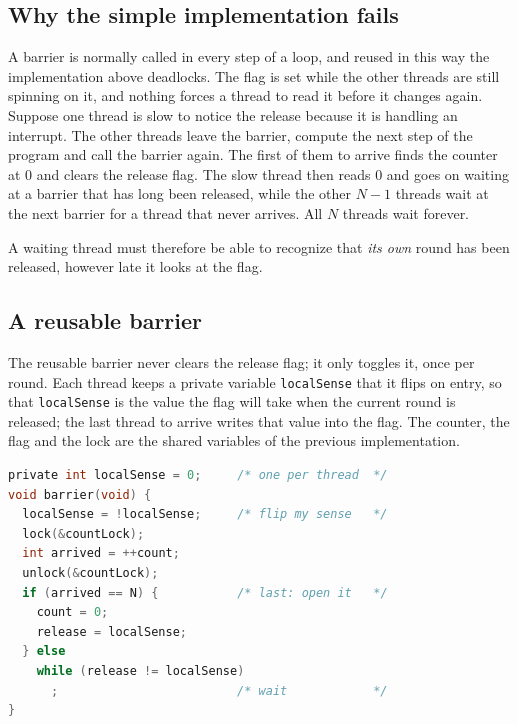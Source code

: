\documentclass[../main.tex]{subfiles}
\begin{document}
\subsection{Why the simple implementation fails}

A barrier is normally called in every step of a loop, and reused in this
way the implementation above deadlocks.  The flag is set while the other
threads are still spinning on it, and nothing forces a thread to read it
before it changes again.  Suppose one thread is slow to notice the release
because it is handling an interrupt.  The other threads leave the barrier,
compute the next step of the program and call the barrier again.  The first
of them to arrive finds the counter at 0 and clears the release flag.  The
slow thread then reads 0 and goes on waiting at a barrier that has long been
released, while the other $N-1$ threads wait at the next barrier for a
thread that never arrives.  All $N$ threads wait forever.

A waiting thread must therefore be able to recognize that \emph{its own}
round has been released, however late it looks at the flag.

\subsection{A reusable barrier}

The reusable barrier never clears the release flag; it only toggles it, once
per round.  Each thread keeps a private variable \texttt{localSense} that it
flips on entry, so that \texttt{localSense} is the value the flag will take
when the current round is released; the last thread to arrive writes that
value into the flag.  The counter, the flag and the lock are the shared
variables of the previous implementation.
\begin{lstlisting}[language=C, numbers=none, morekeywords={shared,private}]
private int localSense = 0;     /* one per thread  */
void barrier(void) {
  localSense = !localSense;     /* flip my sense   */
  lock(&countLock);
  int arrived = ++count;
  unlock(&countLock);
  if (arrived == N) {           /* last: open it   */
    count = 0;
    release = localSense;
  } else
    while (release != localSense)
      ;                         /* wait            */
}
\end{lstlisting}
\end{document}
